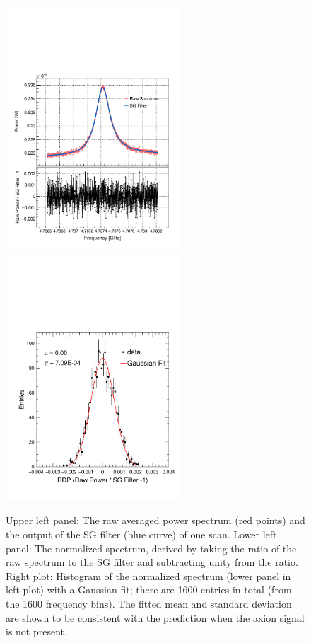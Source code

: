 \documentclass[%
reprint, %
superscriptaddress,
 amsmath,amssymb,
 aps
]{revtex4-2}
\begin{document}
\begin{figure} [htbp]
  \centering
  \includegraphics[width=6.5cm]{Figure2a.pdf}
  \includegraphics[width=6.5cm]{Figure2b.pdf}
  \caption{Upper left panel: The raw averaged power spectrum (red points) and 
the output of the SG filter (blue curve) of one scan. Lower left panel: The 
normalized spectrum,  derived by taking the ratio of the raw spectrum to the 
SG filter and subtracting unity from the ratio. Right plot: Histogram of the 
normalized spectrum (lower panel in left plot) with a Gaussian 
fit; there are 1600 entries in total (from the 1600 frequency bins). 
The fitted mean and standard deviation are shown to be consistent with the 
prediction when the axion signal is not present.}
  \label{fig:raw_sg_power}
\end{figure}
\end{document}
